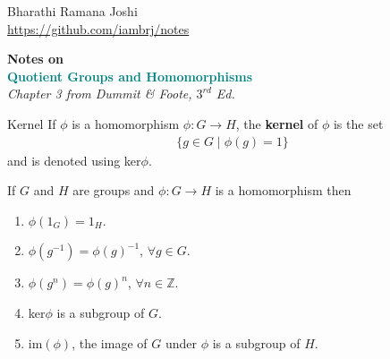 \documentclass[titlepage, 12pt]{article}
\newcommand*{\logo}{\fbox{$\mathfrak{BRJ}$}}
\begin{document}
\begin{titlepage} %

	\raggedleft%

	\vspace*{\baselineskip} %

	{Bharathi Ramana Joshi\\\url{https://github.com/iambrj/notes}} %

	\vspace*{0.167\textheight} %

	\textbf{\LARGE Notes on}\\[\baselineskip] %

	\textbf{\textcolor{teal}{\huge Quotient Groups and Homomorphisms}}\\[\baselineskip] %

    {\Large \textit{Chapter 3 from Dummit \& Foote, $3^{rd}$ Ed.}} %

	\vfill %

	{\large \logo} %

	\vspace*{3\baselineskip} %

\end{titlepage}

\newpage

\begin{definition}{Kernel}{}
    If $\phi$ is a homomorphism $\phi:G\rightarrow H$, the \textbf{kernel} of
    $\phi$ is the set
    \begin{gather*}
        \{g\in G\mid\phi(g) = 1\}
    \end{gather*}
    and is denoted using ker$\phi$.
\end{definition}
If $G$ and $H$ are groups and $\phi:G\rightarrow H$ is a homomorphism
then
\begin{enumerate}
    \item$\phi(1_G) = 1_H$.
    \item$\phi(g^{-1}) = \phi(g)^{-1}$, $\forall g\in G$.
    \item$\phi(g^n) = \phi(g)^n$, $\forall n\in\mathbb{Z}$.
    \item ker$\phi$ is a subgroup of $G$.
    \item im$(\phi)$, the image of $G$ under $\phi$ is a subgroup of $H$.
\end{enumerate}
\end{document}
